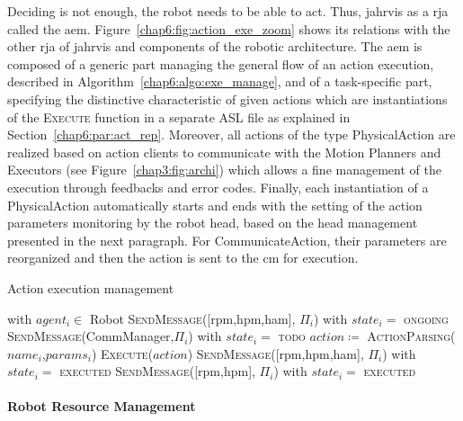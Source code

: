 \documentclass[a4paper,11pt,twoside]{StyleThese}
\begin{document}
Deciding is not enough, the robot needs to be able to act. Thus, \acrshort{jahrvis} as a \acrfull{rja} called the \acrfull{aem}. Figure~\ref{chap6:fig:action_exe_zoom} shows its relations with the other \acrshort{rja} of \acrshort{jahrvis} and components of the robotic architecture. The \acrshort{aem} is composed of a generic part managing the general flow of an action execution, described in Algorithm~\ref{chap6:algo:exe_manage}, and of a task-specific part, specifying the distinctive characteristic of given actions which are instantiations of the \textsc{Execute} function in a separate ASL file as explained in Section~\ref{chap6:par:act_rep}. Moreover, all actions of the type PhysicalAction are realized based on action clients to communicate with the Motion Planners and Executors (see Figure~\ref{chap3:fig:archi}) which allows a fine management of the execution through feedbacks and error codes. Finally, each instantiation of a PhysicalAction automatically starts and ends with the setting of the action parameters monitoring by the robot head, based on the head management presented in the next paragraph. For CommunicateAction, their parameters are reorganized and then the action is sent to the \acrshort{cm} for execution. 

\begin{algorithm}[!htb]
	\caption{Action execution management}
	\label{chap6:algo:exe_manage}
	\begin{algorithmic}
	 with $agent_i \in$ Robot
		\State \textsc{SendMessage}([\acrshort{rpm},\acrshort{hpm},\acrshort{ham}], $\Pi_i$) with $state_i=$ \textsc{ongoing}
		\State {}
		\State \textsc{SendMessage}(CommManager,$\Pi_i$) with $state_i=$ \textsc{todo}
	\EndIf
	\State $action \coloneqq$ \textsc{ActionParsing($name_i$,$params_i$)}
	\State \textsc{Execute($action$)}
		\State \textsc{SendMessage}([\acrshort{rpm},\acrshort{hpm},\acrshort{ham}], $\Pi_i$) with $state_i=$ \textsc{executed}
		\State \textsc{SendMessage}([\acrshort{rpm},\acrshort{hpm}], $\Pi_i$) with $state_i=$ \textsc{executed}
	\EndIf
	\EndFunction
	\end{algorithmic}
\end{algorithm}	



\paragraph{Robot Resource Management}\label{chap6:para:resource_m}
\end{document}
